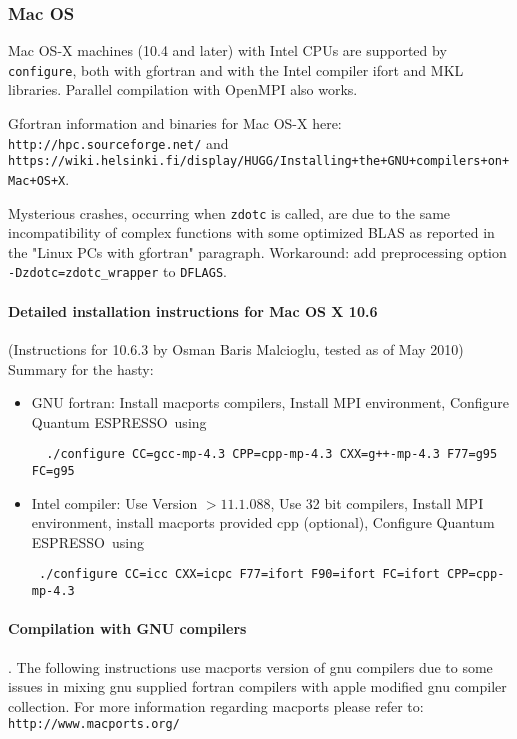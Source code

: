 \documentclass[12pt,a4paper]{article}
\def\qe{{\sc Quantum ESPRESSO}}
\def\configure{\texttt{configure}}
\begin{document}
\subsubsection{Mac OS}

Mac OS-X machines (10.4 and later) with Intel CPUs are supported
by \configure, both with gfortran and with the Intel compiler ifort
and MKL libraries.
Parallel compilation with OpenMPI also works.

Gfortran information and binaries for Mac OS-X here:
\texttt{http://hpc.sourceforge.net/} and
\texttt{https://wiki.helsinki.fi/display/HUGG/Installing+the+GNU+compilers+on+Mac+OS+X}.

Mysterious crashes, occurring when \texttt{zdotc} is called, are due
to the same incompatibility of complex functions with some optimized
BLAS as reported in the "Linux PCs with gfortran" paragraph. Workaround:
add preprocessing option \texttt{-Dzdotc=zdotc\_wrapper} to \texttt{DFLAGS}.

\paragraph{Detailed installation instructions for Mac OS X 10.6}

(Instructions for 10.6.3 by Osman Baris Malcioglu, tested as of May 2010)
Summary for the hasty:
\begin{itemize}
\item GNU fortran:
Install macports compilers,
Install MPI environment,
Configure \qe\  using
\begin{verbatim}
  ./configure CC=gcc-mp-4.3 CPP=cpp-mp-4.3 CXX=g++-mp-4.3 F77=g95 FC=g95
\end{verbatim}
\item Intel compiler:
Use Version $>11.1.088$,
Use 32 bit compilers,
Install MPI environment,
install macports provided cpp (optional),
Configure \qe\ using
\begin{verbatim}
 ./configure CC=icc CXX=icpc F77=ifort F90=ifort FC=ifort CPP=cpp-mp-4.3
\end{verbatim}
\end{itemize}

\paragraph{Compilation with GNU compilers}.
The following instructions use macports version of gnu compilers due to some
issues in mixing gnu supplied fortran compilers with apple modified gnu compiler
collection. For more information regarding macports please refer to:
\texttt{http://www.macports.org/}
\end{document}
